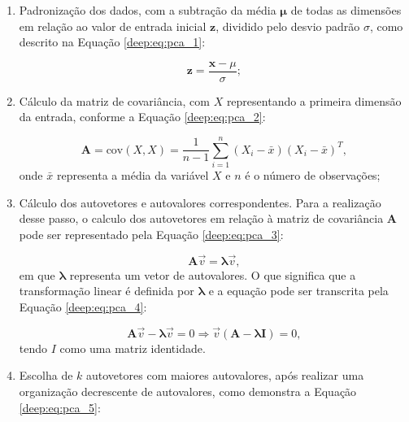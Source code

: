 \begin{enumerate}
    \item Padronização dos dados, com a subtração da média $\boldsymbol{\mu}$ de todas as dimensões em relação ao valor de entrada inicial $\boldsymbol{z}$, dividido pelo desvio padrão $\sigma$, como descrito na Equação \ref{deep:eq:pca_1}:

    \begin{equation}
        \label{deep:eq:pca_1}
        \boldsymbol{z} = \frac{\boldsymbol{x} - \mu}{\sigma};
    \end{equation}

    \item Cálculo da matriz de covariância, com $X$ representando a primeira dimensão da entrada, conforme a Equação \ref{deep:eq:pca_2}:
    
    \begin{equation}
        \label{deep:eq:pca_2}
        \boldsymbol{A} = \text{cov}(X,X) = \frac{1}{n-1} \sum_{i=1}^{n} (X_i - \bar{x}) (X_i - \bar{x})^T,
    \end{equation}
    onde \(\bar{x}\) representa a média da variável $X$ e $n$ é o número de observações;

    \item Cálculo dos autovetores e autovalores correspondentes. Para a realização desse passo, o calculo dos autovetores em relação à matriz de covariância $\boldsymbol{A}$ pode ser representado pela Equação \ref{deep:eq:pca_3}:

    \begin{equation}
        \label{deep:eq:pca_3}
        \boldsymbol{A}\overrightarrow{v} = \boldsymbol{\lambda}\overrightarrow{v},
    \end{equation}
    em que $\boldsymbol{\lambda}$ representa um vetor de autovalores. O que significa que a transformação linear é definida por $\boldsymbol{\lambda}$ e a equação pode ser transcrita pela Equação \ref{deep:eq:pca_4}:

        \begin{equation}
        \label{deep:eq:pca_4}
        \boldsymbol{A}\overrightarrow{v} - \boldsymbol{\lambda}\overrightarrow{v} = 0
        \Rightarrow \overrightarrow{v}(\boldsymbol{A} - \boldsymbol{\lambda} \boldsymbol{I}) = 0,
    \end{equation}
    tendo $I$ como uma matriz identidade.

    \item Escolha de $k$ autovetores com maiores autovalores, após realizar uma organização decrescente de autovalores, como demonstra a Equação \ref{deep:eq:pca_5}:


\end{enumerate}
